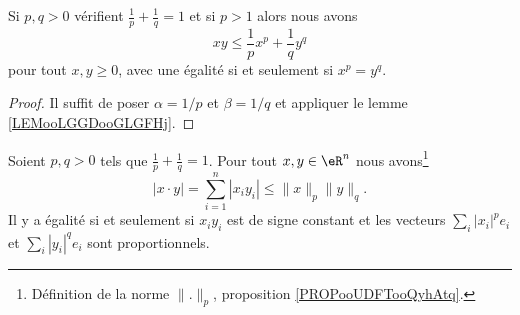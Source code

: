\begin{corollary}       \label{CORooTCBZooAcZxaC}
	Si \( p,q>0\) vérifient \( \frac{1}{ p }+\frac{1}{ q }=1\) et si \( p>1\) alors nous avons
	\begin{equation}        \label{EQooWKTSooQwRsLz}
		xy\leq \frac{1}{ p }x^{p}+\frac{1}{ q }y^q
	\end{equation}
	pour tout \( x,y\geq 0\), avec une égalité si et seulement si \( x^p=y^q\).
\end{corollary}

\begin{proof}
	Il suffit de poser \( \alpha=1/p\) et \( \beta=1/q\) et appliquer le lemme \ref{LEMooLGGDooGLGFHj}.
\end{proof}

\begin{theorem}        \label{THOooYHMJooBlXfpl}
	Soient \( p,q>0\) tels que \( \frac{1}{ p }+\frac{1}{ q }=1\). Pour tout \( x,y\in \eR^n\) nous avons\footnote{Définition de la norme \( \| . \|_p\), proposition \ref{PROPooUDFTooQyhAtq}.}
	\begin{equation}
		| x\cdot y |=\sum_{i=1}^n| x_iy_i |\leq \| x \|_p\| y \|_q.
	\end{equation}
	Il y a égalité si et seulement si \( x_iy_i\) est de signe constant et les vecteurs \( \sum_i| x_i |^pe_i\) et \( \sum_i| y_i |^qe_i\) sont proportionnels.
\end{theorem}

